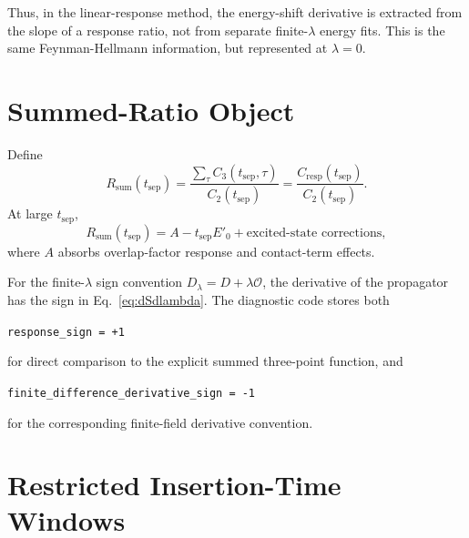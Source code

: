 \documentclass[11pt,a4paper]{article}
\newcommand{\Dslash}{D}
\newcommand{\Ocur}{\mathcal{O}}
\newcommand{\Ctwo}{C_2}
\newcommand{\Cthree}{C_3}
\newcommand{\Cresp}{C_{\mathrm{resp}}}
\newcommand{\Rsum}{R_{\mathrm{sum}}}
\begin{document}
Thus, in the linear-response method, the energy-shift derivative is extracted
from the slope of a response ratio, not from separate finite-\(\lambda\) energy
fits.  This is the same Feynman-Hellmann information, but represented at
\(\lambda=0\).

\section{Summed-Ratio Object}

Define
\begin{equation}
  \Rsum(t_{\mathrm{sep}})
  =
  \frac{
    \sum_\tau \Cthree(t_{\mathrm{sep}},\tau)
  }{
    \Ctwo(t_{\mathrm{sep}})
  }
  =
  \frac{
    \Cresp(t_{\mathrm{sep}})
  }{
    \Ctwo(t_{\mathrm{sep}})
  }.
\end{equation}
At large \(t_{\mathrm{sep}}\),
\begin{equation}
  \Rsum(t_{\mathrm{sep}})
  =
  A - t_{\mathrm{sep}} E'_0
  + \text{excited-state corrections},
\label{eq:summed_ratio_slope}
\end{equation}
where \(A\) absorbs overlap-factor response and contact-term effects.

For the finite-\(\lambda\) sign convention
\(\Dslash_\lambda=\Dslash+\lambda\Ocur\), the derivative of the propagator has
the sign in Eq.~\eqref{eq:dSdlambda}.  The diagnostic code stores both
\begin{center}
\texttt{response\_sign = +1}
\end{center}
for direct comparison to the explicit summed three-point function, and
\begin{center}
\texttt{finite\_difference\_derivative\_sign = -1}
\end{center}
for the corresponding finite-field derivative convention.

\section{Restricted Insertion-Time Windows}
\end{document}
